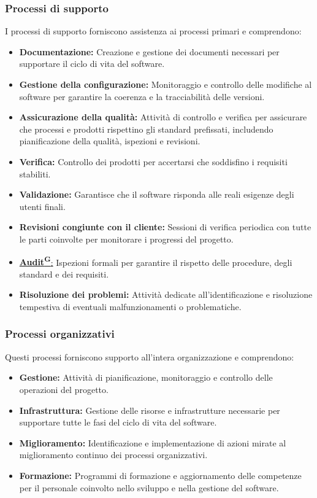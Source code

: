 \subsubsection{Processi di supporto}
I processi di supporto forniscono assistenza ai processi primari e comprendono:
\begin{itemize}
    \item \textbf{Documentazione:} Creazione e gestione dei documenti necessari per supportare il ciclo di vita del software.
    \item \textbf{Gestione della configurazione:} Monitoraggio e controllo delle modifiche al software per garantire la coerenza e la tracciabilità delle versioni.
    \item \textbf{Assicurazione della qualità:} Attività di controllo e verifica per assicurare che processi e prodotti rispettino gli standard prefissati, includendo pianificazione della qualità, ispezioni e revisioni.
    \item \textbf{Verifica:} Controllo dei prodotti per accertarsi che soddisfino i requisiti stabiliti.
    \item \textbf{Validazione:} Garantisce che il software risponda alle reali esigenze degli utenti finali.
    \item \textbf{Revisioni congiunte con il cliente:} Sessioni di verifica periodica con tutte le parti coinvolte per monitorare i progressi del progetto.
    \item \href{https://code7crusaders.github.io/docs/RTB/documentazione_interna/glossario.html#audit}{\textbf{Audit\textsuperscript{G}}:} Ispezioni formali per garantire il rispetto delle procedure, degli standard e dei requisiti.
    \item \textbf{Risoluzione dei problemi:} Attività dedicate all'identificazione e risoluzione tempestiva di eventuali malfunzionamenti o problematiche.
\end{itemize}

\subsubsection{Processi organizzativi}
Questi processi forniscono supporto all’intera organizzazione e comprendono:
\begin{itemize}
    \item \textbf{Gestione:} Attività di pianificazione, monitoraggio e controllo delle operazioni del progetto.
    \item \textbf{Infrastruttura:} Gestione delle risorse e infrastrutture necessarie per supportare tutte le fasi del ciclo di vita del software.
    \item \textbf{Miglioramento:} Identificazione e implementazione di azioni mirate al miglioramento continuo dei processi organizzativi.
    \item \textbf{Formazione:} Programmi di formazione e aggiornamento delle competenze per il personale coinvolto nello sviluppo e nella gestione del software.
\end{itemize}
